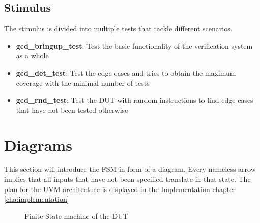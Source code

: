 \subsection*{Stimulus}
The stimulus is divided into multiple tests that tackle different scenarios.
\begin{itemize}
    \item \textbf{gcd\_bringup\_test}: Test the basic functionality of the verification system as a whole
    \item \textbf{gcd\_det\_test}: Test the edge cases and tries to obtain the maximum coverage with the minimal number of tests
    \item \textbf{gcd\_rnd\_test}: Test the DUT with random instructions to find edge cases that have not been tested otherwise
\end{itemize}

\section{Diagrams}
This section will introduce the FSM in form of a diagram.
Every nameless arrow implies that all inputs that have not been specified translate in that state.
The plan for the UVM architecture is displayed in the Implementation chapter \ref{cha:implementation}
\begin{figure}[htbp]
  \centering
  
  \caption{Finite State machine of the DUT}
\end{figure}